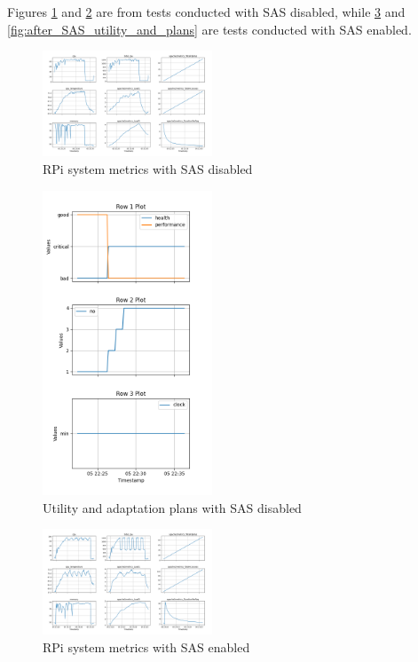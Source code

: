 \documentclass[conference]{IEEEtran}
\begin{document}
Figures \ref{fig:before_SAS_metrics} and \ref{fig:before_SAS_utility_and_plans} are from tests conducted with SAS disabled, while \ref{fig:after_SAS_metrics} and \ref{fig:after_SAS_utility_and_plans} are tests conducted with SAS enabled.

\begin{figure}[H]
    \centering
    \includegraphics[width=0.45\textwidth]{./media/before_SAS_metrics.png}
    \caption{RPi system metrics with SAS disabled}
    \label{fig:before_SAS_metrics}
\end{figure}

\begin{figure}[H]
    \centering
    \includegraphics[width=0.45\textwidth]{./media/before_SAS_utility_and_plans.png}
    \caption{Utility and adaptation plans with SAS disabled}
    \label{fig:before_SAS_utility_and_plans}
\end{figure}

\begin{figure}[H]
    \centering
    \includegraphics[width=0.45\textwidth]{./media/after_SAS_metrics.png}
    \caption{RPi system metrics with SAS enabled}
    \label{fig:after_SAS_metrics}
\end{figure}
\end{document}
